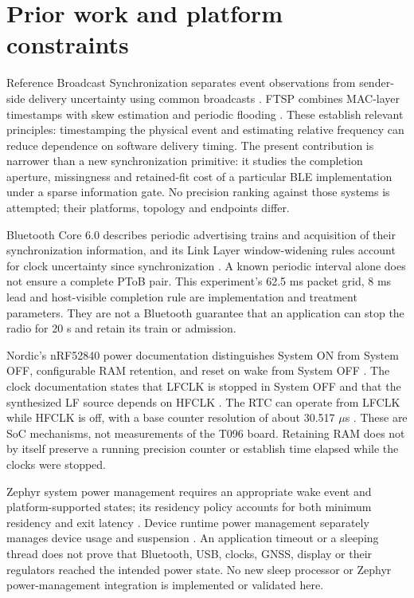 \documentclass[11pt,letterpaper]{article}
\begin{document}
\section{Prior work and platform constraints}\label{sec:prior}
Reference Broadcast Synchronization separates event observations from sender-side delivery uncertainty using common broadcasts \cite{rbs}. FTSP combines MAC-layer timestamps with skew estimation and periodic flooding \cite{ftsp}. These establish relevant principles: timestamping the physical event and estimating relative frequency can reduce dependence on software delivery timing. The present contribution is narrower than a new synchronization primitive: it studies the completion aperture, missingness and retained-fit cost of a particular BLE implementation under a sparse information gate. No precision ranking against those systems is attempted; their platforms, topology and endpoints differ.

Bluetooth Core 6.0 describes periodic advertising trains and acquisition of their synchronization information, and its Link Layer window-widening rules account for clock uncertainty since synchronization \cite{btcore}. A known periodic interval alone does not ensure a complete PToB pair. This experiment's 62.5 ms packet grid, 8 ms lead and host-visible completion rule are implementation and treatment parameters. They are not a Bluetooth guarantee that an application can stop the radio for 20 s and retain its train or admission.

Nordic's nRF52840 power documentation distinguishes System ON from System OFF, configurable RAM retention, and reset on wake from System OFF \cite{nordicpower}. The clock documentation states that LFCLK is stopped in System OFF and that the synthesized LF source depends on HFCLK \cite{nordicclock}. The RTC can operate from LFCLK while HFCLK is off, with a base counter resolution of about 30.517 $\mu$s \cite{nordicrtc}. These are SoC mechanisms, not measurements of the T096 board. Retaining RAM does not by itself preserve a running precision counter or establish time elapsed while the clocks were stopped.

Zephyr system power management requires an appropriate wake event and platform-supported states; its residency policy accounts for both minimum residency and exit latency \cite{zephyrsystem}. Device runtime power management separately manages device usage and suspension \cite{zephyrruntime}. An application timeout or a sleeping thread does not prove that Bluetooth, USB, clocks, GNSS, display or their regulators reached the intended power state. No new sleep processor or Zephyr power-management integration is implemented or validated here.
\end{document}
